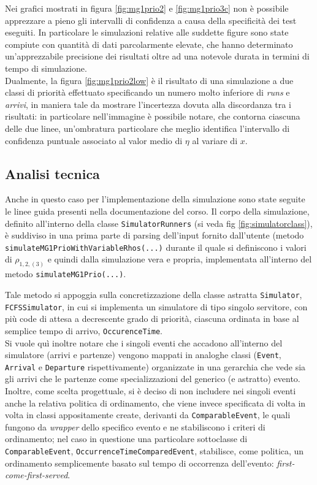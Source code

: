 Nei grafici mostrati in figura \ref{fig:mg1prio2} e \ref{fig:mg1prio3c} non \`e possibile apprezzare a pieno gli intervalli di confidenza a causa della specificit\`a dei test eseguiti. In particolare le simulazioni relative alle suddette figure sono state compiute con quantit\`a di dati parcolarmente elevate, che  hanno determinato un'apprezzabile precisione dei risultati oltre ad una notevole durata in termini di tempo di simulazione. \\ Dualmente, la figura \ref{fig:mg1prio2low} \`e il risultato di una simulazione a due classi di priorit\`a effettuato specificando un numero molto inferiore di \emph{runs} e \emph{arrivi}, in maniera tale da mostrare l'incertezza dovuta alla discordanza tra i risultati: in particolare nell'immagine \`e possibile notare, che contorna ciascuna delle due linee, un'ombratura particolare che meglio identifica l'intervallo di confidenza puntuale associato al valor medio di $\eta$ al variare di $x$. 

\subsection{Analisi tecnica}

Anche in questo caso per l'implementazione della simulazione sono state seguite le linee guida presenti nella documentazione del corso. Il corpo della simulazione, definito all'interno della classe {\tt SimulatorRunners} (si veda fig \ref{fig:simulatorclass}), \`e suddiviso in una prima parte di parsing dell'input fornito dall'utente (metodo {\tt simulateMG1PrioWithVariableRhos(...)} durante il quale si definiscono i valori di $\rho_{1,2,(3)}$ e quindi dalla simulazione vera e propria, implementata all'interno del metodo {\tt simulateMG1Prio(...)}.

Tale metodo si appoggia sulla concretizzazione della classe astratta {\tt Simulator}, {\tt FCFSSimulator}, in cui si implementa un simulatore di tipo singolo servitore, con pi\`u code di attesa a decrescente grado di priorit\`a, ciascuna ordinata in base al semplice tempo di arrivo, {\tt OccurenceTime}. \\ Si vuole qu\`i inoltre notare che i singoli eventi che accadono all'interno del simulatore (arrivi e partenze) vengono mappati in analoghe classi ({\tt Event}, {\tt Arrival} e {\tt Departure} rispettivamente) organizzate in una gerarchia che vede sia gli arrivi che le partenze come specializzazioni del generico (e astratto) evento. Inoltre, come scelta progettuale, si \`e deciso di non includere nei singoli eventi anche la relativa politica di ordinamento, che viene invece specificata di volta in volta in classi appositamente create, derivanti da {\tt ComparableEvent}, le quali fungono da \emph{wrapper} dello specifico evento e ne stabiliscono i criteri di ordinamento; nel caso in questione una particolare sottoclasse di {\tt ComparableEvent}, {\tt OccurrenceTimeComparedEvent}, stabilisce, come politica, un ordinamento semplicemente basato sul tempo di occorrenza dell'evento: \emph{first-come-first-served}.









